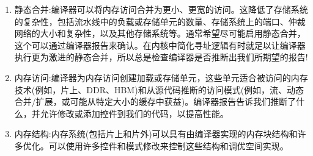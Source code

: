 \begin{enumerate}
	\item 静态合并:编译器可以将内存访问合并为更小、更宽的访问。这降低了存储系统的复杂性，包括流水线中的负载或存储单元的数量、存储系统上的端口、仲裁网络的大小和复杂性，以及其他存储系统等。通常希望尽可能启用静态合并，这个可以通过编译器报告来确认。在内核中简化寻址逻辑有时就足以让编译器执行更为激进的静态合并，所以总是检查编译器是否推断出我们所期望的报告!
	\item 内存访问:编译器为内存访问创建加载或存储单元，这些单元适合被访问的内存技术(例如，片上、DDR、HBM)和从源代码推断的访问模式(例如，流、动态合并/扩展，或可能从特定大小的缓存中获益)。编译器报告告诉我们推断了什么，并允许修改或添加控件到我们的代码，以提高性能。
	\item 内存结构:内存系统(包括片上和片外)可以具有由编译器实现的内存块结构和许多优化。可以使用许多控件和模式修改来控制这些结构和调优空间实现。
\end{enumerate}

















